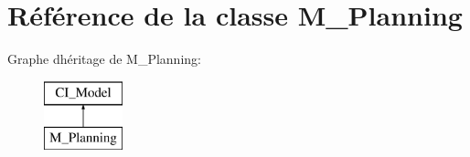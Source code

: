 \hypertarget{class_m___planning}{}\section{Référence de la classe M\+\_\+\+Planning}
\label{class_m___planning}
Graphe d\textquotesingle{}héritage de M\+\_\+\+Planning\+:\begin{figure}[H]
\begin{center}
\leavevmode
\includegraphics[height=2.000000cm]{class_m___planning}
\end{center}
\end{figure}
